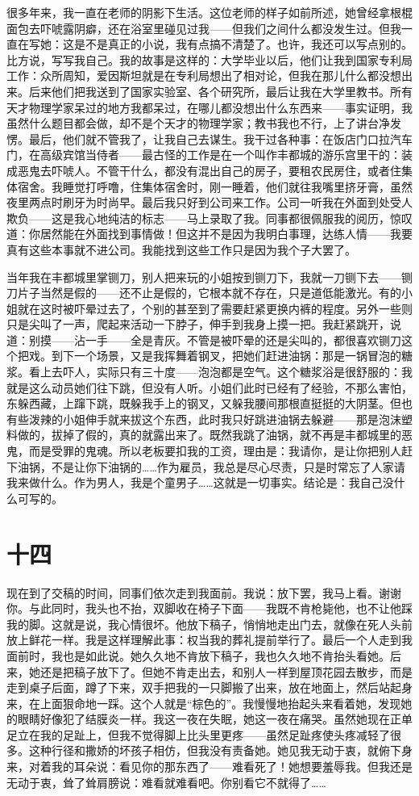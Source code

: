 很多年来，我一直在老师的阴影下生活。这位老师的样子如前所述，她曾经拿根棍面包去吓唬露阴癖，还在浴室里碰见过我——但我们之间什么都没发生过。但我一直在写她：这是不是真正的小说，我有点搞不清楚了。也许，我还可以写点别的。比方说，写写我自己。我的故事是这样的：大学毕业以后，他们让我到国家专利局工作：众所周知，爱因斯坦就是在专利局想出了相对论，但我在那儿什么都没想出来。后来他们把我送到了国家实验室、各个研究所，最后让我在大学里教书。所有天才物理学家呆过的地方我都呆过，在哪儿都没想出什么东西来——事实证明，我虽然什么题目都会做，却不是个天才的物理学家；教书我也不行，上了讲台净发愣。最后，他们就不管我了，让我自己去谋生。我干过各种事：在饭店门口拉汽车门，在高级宾馆当侍者——最古怪的工作是在一个叫作丰都城的游乐宫里干的：装成恶鬼去吓唬人。不管干什么，都没有混出自己的房子，要租农民房住，或者住集体宿舍。我睡觉打呼噜，住集体宿舍时，刚一睡着，他们就往我嘴里挤牙膏，虽然夜里两点时刷牙为时尚早。最后我只好到公司来工作。公司一听我在外面到处受人欺负——这是我心地纯洁的标志——马上录取了我。同事都很佩服我的阅历，惊叹道：你居然能在外面找到事情做！但这并不是因为我明白事理，达练人情——我要真有这些本事就不进公司。我能找到这些工作只是因为我个子大罢了。 

当年我在丰都城里掌铡刀，别人把来玩的小姐按到铡刀下，我就一刀铡下去——铡刀片子当然是假的——还不止是假的，它根本就不存在，只是道低能激光。有的小姐就在这时被吓晕过去了，个别的甚至到了需要赶紧更换内裤的程度。另外一些则只是尖叫了一声，爬起来活动一下脖子，伸手到我身上摸一把。我赶紧跳开，说道：别摸——沾一手——全是青灰。不管是被吓晕的还是尖叫的，都很喜欢铡刀这个把戏。到下一个场景，又是我挥舞着钢叉，把她们赶进油锅：那是一锅冒泡的糖浆。看上去吓人，实际只有三十度——泡泡都是空气。这个糖浆浴是很舒服的：我就是这么动员她们往下跳，但没有人听。小姐们此时已经有了经验，不那么害怕，东躲西藏，上蹿下跳，既躲我手上的钢叉，又躲我腰间那根直挺挺的大阴茎。但也有些泼辣的小姐伸手就来拔这个东西，此时我只好跳进油锅去躲避——那是泡沫塑料做的，拔掉了假的，真的就露出来了。既然我跳了油锅，就不再是丰都城里的恶鬼，而是受罪的鬼魂。所以老板要扣我的工资，理由是：我请你，是让你把别人赶下油锅，不是让你下油锅的……作为雇员，我总是尽心尽责，只是时常忘了人家请我来做什么。作为男人，我是个童男子……这就是一切事实。结论是：我自己没什么可写的。 
\section*{十四} 

现在到了交稿的时间，同事们依次走到我面前。我说：放下罢，我马上看。谢谢你。与此同时，我头也不抬，双脚收在椅子下面——我既不肯枪毙他，也不让他踩我的脚。这就是说，我心情很坏。他放下稿子，悄悄地走出门去，就像在死人头前放上鲜花一样。我是这样理解此事：权当我的葬礼提前举行了。最后一个人走到我面前时，我也是如此说。她久久地不肯放下稿子，我也久久地不肯抬头看她。后来，她还是把稿子放下了。但她不肯走出去，和别人一样到屋顶花园去散步，而是走到桌子后面，蹲了下来，双手把我的一只脚搬了出来，放在地面上，然后站起身来，在上面狠命地一踩。这个人就是“棕色的”。我慢慢地抬起头来看着她，发现她的眼睛好像犯了结膜炎一样。我这一夜在失眠，她这一夜在痛哭。虽然她现在正单足立在我的足趾上，但我不觉得脚上比头里更疼——虽然足趾疼使头疼减轻了很多。这种行径和撒娇的坏孩子相仿，但我没有责备她。她见我无动于衷，就俯下身来，对着我的耳朵说：看见你的那东西了——难看死了！她想要羞辱我。但我还是无动于衷，耸了耸肩膀说：难看就难看吧。你别看它不就得了…… 

